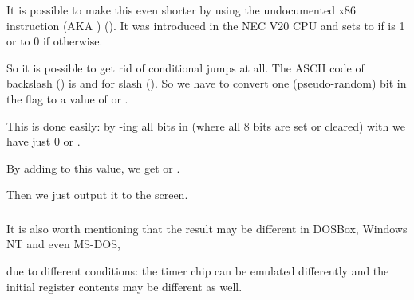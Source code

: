 It is possible to 
make this even shorter by using the undocumented x86 instruction  (\ac{AKA} ) ().
It was introduced in the NEC V20 \ac{CPU} and sets  to 
 if  is 1 or to 0 if otherwise.



So it is possible to get rid of conditional jumps at all.
The \ac{ASCII} code of backslash (\q{\textbackslash{}}) 
is  and  for slash (\q{/}).
So we have to convert one (pseudo-random) bit in the  flag to a value of  or .

This is done easily: by -ing all bits in  (where all 8 bits are set or cleared) with  we have just 0 or .

By adding  to this value, we get  or .

Then we just output it to the screen.

\subsubsection{\Conclusion{}}

It is also worth mentioning that the result may 
be different in DOSBox, \gls{Windows NT} and even MS-DOS, 

due to different
conditions: the timer chip can be emulated differently and the initial register contents may be different as well.
